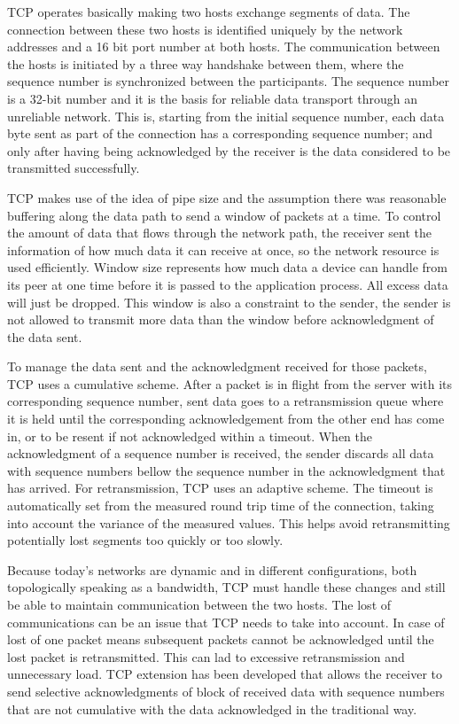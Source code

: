 TCP operates basically making two hosts exchange segments of data. The
connection between these two hosts is identified uniquely by the network addresses and a 16 bit port number at both hosts. The communication between the
hosts is initiated by a three way handshake between them, where the
sequence number is synchronized between the participants. The sequence number
is a 32-bit number and it is the basis for reliable data transport through an unreliable network. This is, starting from the initial sequence
number, each data byte sent as part of the connection has a corresponding
sequence number; and only after having being acknowledged by the receiver is
the data considered to be transmitted successfully.

TCP makes use of the idea of pipe size and the assumption there was reasonable buffering along the data path to send a window of packets at
a time. To control the amount of data that flows through the network path, the
receiver sent the information of how much data it can receive at once, so the
network resource is used efficiently. Window size represents how much data a
device can handle from its peer at one time before it is passed to the
application process. All excess data will just be dropped. This window
is also a constraint to the sender, the sender is not allowed to
transmit more data than the window before acknowledgment of the data sent.

To manage the data sent and the acknowledgment received for those packets, TCP
uses a cumulative scheme. After a packet is in flight from the server with its
corresponding sequence number, sent data goes to a retransmission queue where
it is held until the corresponding acknowledgement from the other end has come in,
or to be resent if not acknowledged within a timeout. When the
acknowledgment of a sequence number is received, the sender discards all data
with sequence numbers bellow the sequence number in the acknowledgment that
has arrived. For retransmission, TCP uses an adaptive scheme. The timeout is
automatically set from the measured round trip time of the connection,
taking into account the variance of the measured values\cite{JacobsonCAC}.
This helps avoid retransmitting potentially lost segments too quickly or too
slowly.

Because today's networks are dynamic and in different configurations, both
topologically speaking as a  bandwidth, TCP must handle these changes and
still be able to maintain communication between the two hosts. The lost of
communications can be an issue that TCP needs to take into account. In case of
lost of one packet means subsequent packets cannot be acknowledged until the
lost packet is retransmitted. This can lad to excessive retransmission and
unnecessary load. TCP extension has been developed that allows the receiver to
send selective acknowledgments of block of received data with sequence numbers
that are not cumulative with the data acknowledged in the traditional
way\cite{RFC2018}.

